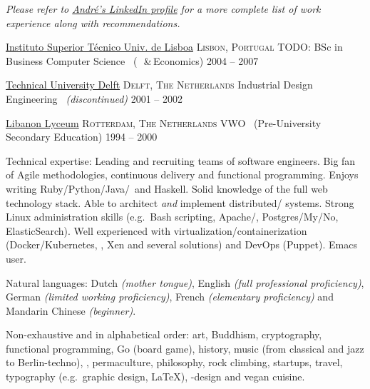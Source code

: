 \documentclass[10pt,a4paper]{article}
\begin{document}
\vspace{-0.2em}
\begin{center}
  \emph{\small Please refer to
  \href{http://www.linkedin.com/in/amalbuquerque}{André's LinkedIn profile} for a more complete list of work experience along with recommendations.}
\end{center}


\spacedhrule{-0.2em}{-0.4em}


\headedsection
  {\href{https://tecnico.ulisboa.pt/en}{Instituto Superior Técnico \textemdash Univ.
  de Lisboa}}
  {\textsc{Lisbon, Portugal}} {%
  \headedsubsection
    {TODO: BSc in Business Computer Science \textnormal{~(~\,\&\,Economics)}}
    {2004 -- 2007}
    {}
}

\headedsection
  {\href{http://www.tudelft.nl/en}{Technical University Delft}}
  {\textsc{Delft, The Netherlands}} {%
  \headedsubsection
    {Industrial Design Engineering \textnormal{\textit{~(discontinued)}}}
    {2001 -- 2002} {}
}

\headedsection
  {\href{http://www.libanonlyceum.nl}{Libanon Lyceum}}
  {\textsc{Rotterdam, The Netherlands}} {%
  \headedsubsection
    {VWO \textnormal{~(Pre-University Secondary Education)}}
    {1994 -- 2000} {}
}


\spacedhrule{0.5em}{-0.4em}


\inlineheadsection  %
  {Technical expertise:}
  {Leading and recruiting teams of software engineers.  Big fan of Agile methodologies, continuous delivery and functional programming.  Enjoys writing Ruby/\nsp Python/\nsp Java/\nsp \CPP~and Haskell.  Solid knowledge of the full web technology stack.  Able to architect \textit{and} implement distributed/ systems.  Strong Linux administration skills (e.g.\ Bash scripting, Apache/, Postgres/My/No, ElasticSearch).  Well experienced with virtualization/containerization (Docker/Kubernetes, , Xen and several  solutions) and DevOps (Puppet).  Emacs user.}

\vspace{0.5em}
\inlineheadsection
  {Natural languages:}
  {Dutch \emph{(mother tongue)}, English \emph{(full professional proficiency)}, German \emph{(limited working proficiency)}, French \emph{(elementary proficiency)} and Mandarin Chinese \emph{(beginner)}.}


\spacedhrule{1.6em}{-0.4em}


\inlineheadsection
  {Non-exhaustive and in alphabetical order:}
  {art, Buddhism, cryptography, functional programming, Go (board game), history, music (from classical and jazz to Berlin-techno), , permaculture, philosophy, rock climbing, startups, travel, typography (e.g.\ graphic design, \LaTeX), -design and vegan cuisine.}
\end{document}
